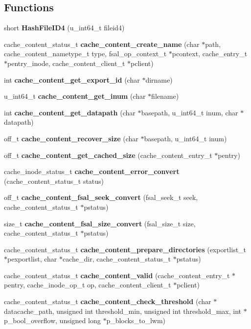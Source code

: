 \subsection*{Functions}
\begin{CompactItemize}
\item 
short {\bf Hash\-File\-ID4} (u\_\-int64\_\-t fileid4)
\item 
cache\_\-content\_\-status\_\-t {\bf cache\_\-content\_\-create\_\-name} (char $\ast$path, cache\_\-content\_\-nametype\_\-t type, fsal\_\-op\_\-context\_\-t $\ast$pcontext, cache\_\-entry\_\-t $\ast$pentry\_\-inode, cache\_\-content\_\-client\_\-t $\ast$pclient)
\item 
int {\bf cache\_\-content\_\-get\_\-export\_\-id} (char $\ast$dirname)
\item 
u\_\-int64\_\-t {\bf cache\_\-content\_\-get\_\-inum} (char $\ast$filename)
\item 
int {\bf cache\_\-content\_\-get\_\-datapath} (char $\ast$basepath, u\_\-int64\_\-t inum, char $\ast$datapath)
\item 
off\_\-t {\bf cache\_\-content\_\-recover\_\-size} (char $\ast$basepath, u\_\-int64\_\-t inum)
\item 
off\_\-t {\bf cache\_\-content\_\-get\_\-cached\_\-size} (cache\_\-content\_\-entry\_\-t $\ast$pentry)
\item 
cache\_\-inode\_\-status\_\-t {\bf cache\_\-content\_\-error\_\-convert} (cache\_\-content\_\-status\_\-t status)
\item 
off\_\-t {\bf cache\_\-content\_\-fsal\_\-seek\_\-convert} (fsal\_\-seek\_\-t seek, cache\_\-content\_\-status\_\-t $\ast$pstatus)
\item 
size\_\-t {\bf cache\_\-content\_\-fsal\_\-size\_\-convert} (fsal\_\-size\_\-t size, cache\_\-content\_\-status\_\-t $\ast$pstatus)
\item 
cache\_\-content\_\-status\_\-t {\bf cache\_\-content\_\-prepare\_\-directories} (exportlist\_\-t $\ast$pexportlist, char $\ast$cache\_\-dir, cache\_\-content\_\-status\_\-t $\ast$pstatus)
\item 
cache\_\-content\_\-status\_\-t {\bf cache\_\-content\_\-valid} (cache\_\-content\_\-entry\_\-t $\ast$pentry, cache\_\-inode\_\-op\_\-t op, cache\_\-content\_\-client\_\-t $\ast$pclient)
\item 
cache\_\-content\_\-status\_\-t {\bf cache\_\-content\_\-check\_\-threshold} (char $\ast$datacache\_\-path, unsigned int threshold\_\-min, unsigned int threshold\_\-max, int $\ast$p\_\-bool\_\-overflow, unsigned long $\ast$p\_\-blocks\_\-to\_\-lwm)

\end{CompactItemize}
